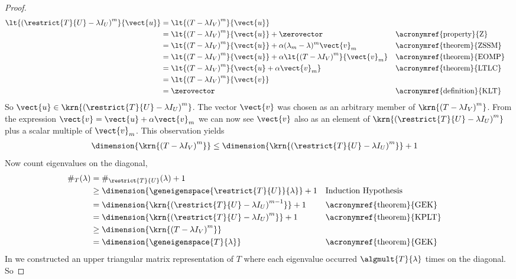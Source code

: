 \begin{proof}
\begin{align*}
\lt{\left(\restrict{T}{U}-\lambda I_U\right)^m}{\vect{u}}
&=
\lt{\left(T-\lambda I_V\right)^m}{\vect{u}}\\
%
&=
\lt{\left(T-\lambda I_V\right)^m}{\vect{u}}+\zerovector
&&\text{\acronymref{property}{Z}}\\
%
&=
\lt{\left(T-\lambda I_V\right)^m}{\vect{u}}+\alpha(\lambda_m-\lambda)^m\vect{v}_m
&&\text{\acronymref{theorem}{ZSSM}}\\
%
&=
\lt{\left(T-\lambda I_V\right)^m}{\vect{u}}+\alpha\lt{\left(T-\lambda I_V\right)^m}{\vect{v}_m}
&&\text{\acronymref{theorem}{EOMP}}\\
%
&=
\lt{\left(T-\lambda I_V\right)^m}{\vect{u}+\alpha\vect{v}_m}
&&\text{\acronymref{theorem}{LTLC}}\\
%
&=
\lt{\left(T-\lambda I_V\right)^m}{\vect{v}}\\
%
&=\zerovector
&&\text{\acronymref{definition}{KLT}}
%
\end{align*}
%
So $\vect{u}\in\krn{\left(\restrict{T}{U}-\lambda I_U\right)^m}$.  The vector $\vect{v}$ was chosen as an arbitrary member of 
$\krn{\left(T-\lambda I_V\right)^m}$.  From the expression $\vect{v}=\vect{u}+\alpha\vect{v}_m$ we can now see $\vect{v}$ also as an element of $\krn{\left(\restrict{T}{U}-\lambda I_U\right)^m}$ plus a scalar multiple of  $\vect{v}_m$.  This observation yields
%
\begin{align*}
\dimension{\krn{\left(T-\lambda I_V\right)^m}}&\leq\dimension{\krn{\left(\restrict{T}{U}-\lambda I_U\right)^m}}+1
\end{align*}
%
Now count eigenvalues on the diagonal,
%
\begin{align*}
\#_{T}(\lambda)
&=\#_{\restrict{T}{U}}(\lambda)+1\\
%
&\geq\dimension{\geneigenspace{\restrict{T}{U}}{\lambda}}+1
&&\text{Induction Hypothesis}\\
%
&=\dimension{\krn{\left(\restrict{T}{U}-\lambda I_U\right)^{m-1}}}+1
&&\text{\acronymref{theorem}{GEK}}\\
%
&=\dimension{\krn{\left(\restrict{T}{U}-\lambda I_U\right)^m}}+1
&&\text{\acronymref{theorem}{KPLT}}\\
%
&\geq\dimension{\krn{\left(T-\lambda I_V\right)^m}}\\
%
&=\dimension{\geneigenspace{T}{\lambda}}
&&\text{\acronymref{theorem}{GEK}}\\
%
\end{align*}
%
In  we constructed an upper triangular matrix representation of $T$ where each eigenvalue occurred $\algmult{T}{\lambda}$ times on the diagonal.  So

\end{proof}
